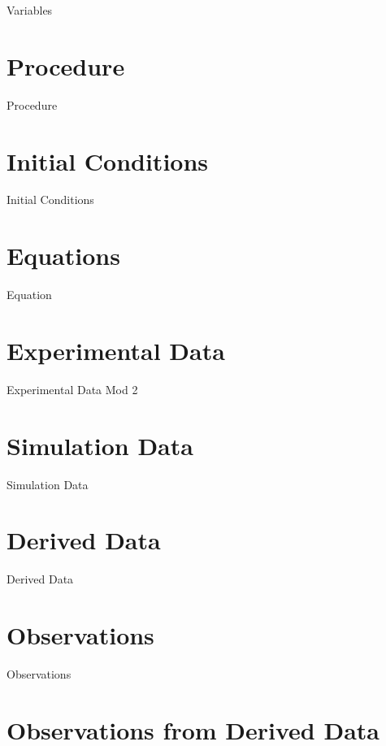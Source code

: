 \documentclass[12pt, a4paper]{report}
\begin{document}
        {Variables}
        
\chapter{{Procedure}}
        
        {Procedure}
        
 \chapter{{Initial Conditions}}
        
        {Initial Conditions}
        
\chapter{{Equations}}
        
        {Equation}
        
\chapter{{Experimental Data}}
        
        {Experimental Data Mod 2}
        
\chapter{{Simulation Data}}
        
        {Simulation Data}
        
\chapter{{Derived Data}}
        
        {Derived Data}
        
\chapter{{Observations}}
        
        {Observations}
        
\chapter{{Observations from Derived Data}}
        
\end{document}

